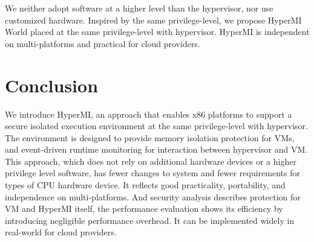 \documentclass[conference]{IEEEtran}
\begin{document}

We neither adopt software at a higher level than the hypervisor, nor use customized hardware. Inspired by the same privilege-level, we propose HyperMI World placed at the same privilege-level with hypervisor. HyperMI is independent on multi-platforms and practical for cloud providers.

\section{Conclusion}\label{sec:conclusion}
We introduce HyperMI, an approach that enables x86 platforms to support a secure isolated execution environment at the same privilege-level with hypervisor. The environment is designed to provide memory isolation protection for VMs, and event-driven runtime monitoring for interaction between hypervisor and VM. This approach, which does not rely on additional hardware devices or a higher privilege level software, has fewer changes to system and fewer requirements for types of CPU hardware device. It reflects good practicality, portability, and independence on multi-platforms. And security analysis describes protection for VM and HyperMI itself, the performance evaluation shows its efficiency by introducing negligible performance overhead. It can be implemented widely in real-world for cloud providers.


 

\end{document}
